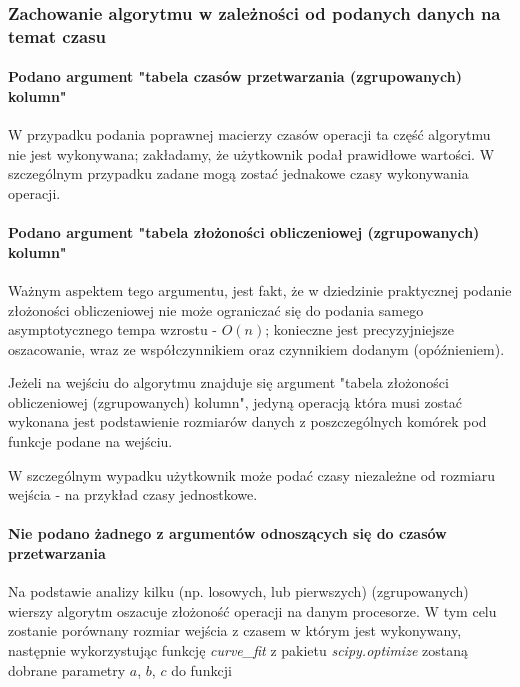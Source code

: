 \documentclass[brudnopis]{xmgr}
\begin{document}
\subsubsection{Zachowanie algorytmu w zależności od podanych danych na temat czasu}

\paragraph{Podano argument "tabela czasów przetwarzania (zgrupowanych) kolumn"}

W przypadku podania poprawnej macierzy czasów operacji ta część algorytmu nie jest wykonywana; zakładamy, że użytkownik podał prawidłowe wartości.
W szczególnym przypadku zadane mogą zostać jednakowe czasy wykonywania operacji.

\paragraph{Podano argument "tabela złożoności obliczeniowej (zgrupowanych) kolumn"}

Ważnym aspektem tego argumentu, jest fakt, że w dziedzinie praktycznej podanie złożoności obliczeniowej nie może ograniczać się do podania samego asymptotycznego tempa wzrostu - $O(n)$; konieczne jest precyzyjniejsze oszacowanie, wraz ze współczynnikiem oraz czynnikiem dodanym (opóźnieniem).

Jeżeli na wejściu do algorytmu znajduje się argument "tabela złożoności obliczeniowej (zgrupowanych) kolumn", jedyną operacją która musi zostać wykonana jest podstawienie rozmiarów danych z poszczególnych komórek pod funkcje podane na wejściu.

W szczególnym wypadku użytkownik może podać czasy niezależne od rozmiaru wejścia - na przykład czasy jednostkowe.

\paragraph{Nie podano żadnego z argumentów odnoszących się do czasów przetwarzania}

Na podstawie analizy kilku (np. losowych, lub pierwszych) (zgrupowanych) wierszy algorytm oszacuje złożoność operacji na danym procesorze.
W tym celu zostanie porównany rozmiar wejścia z czasem w którym jest wykonywany, następnie wykorzystując funkcję \emph{curve\_fit} z pakietu \emph{scipy.optimize} zostaną dobrane parametry $a$, $b$, $c$ do funkcji
\end{document}
